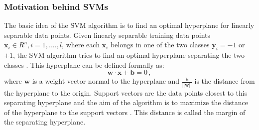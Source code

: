 \documentclass[a4paper,11pt,oneside]{article}
\begin{document}
\subsubsection*{Motivation behind SVMs}
The basic idea of the SVM algorithm is to find an optimal hyperplane for linearly separable data points.
Given linearly separable training data points $\mathbf{x}_i\in R^n,i=1,....,l$, where each $\mathbf{x}_i$
belongs in one of the two classes $\mathbf{y}_i=-1$ or $+1$, the SVM algorithm tries to find an optimal hyperplane
separating the two classes \cite{fletcher2009support}. This hyperplane can be defined formally as:
\begin{equation}
  \mathbf{w}\cdot\mathbf{x} + \mathbf{b} = 0\,,
\end{equation} where $\mathbf{w}$ is a weight vector normal to the hyperplane and $\frac{\mathbf{b}}{||\mathbf{w}||}$
is the distance from the hyperplane to the origin.
Support vectors are the data points closest to this separating
hyperplane and the aim of the algorithm is to maximize the distance of the hyperplane to the support
vectors \cite{law2006simple}. This distance is called the margin of the separating hyperplane.
\end{document}
